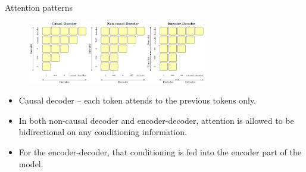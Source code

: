 \documentclass[serif, aspectratio=169]{beamer}
\begin{document}

\begin{frame}{Attention patterns}
    \hspace{2cm}
    \begin{figure}
        \centering
        \includegraphics[width=0.7\textwidth]{pic/attention.png}
        \caption{}
    \end{figure}
    \begin{itemize}
        \item Causal decoder -- each token attends to the previous tokens only. 
        \item In both non-causal decoder and encoder-decoder, attention is allowed to be bidirectional on any conditioning information.
        \item For the encoder-decoder, that conditioning is fed into the encoder part of the model. 
    \end{itemize}
\end{frame}
\end{document}

